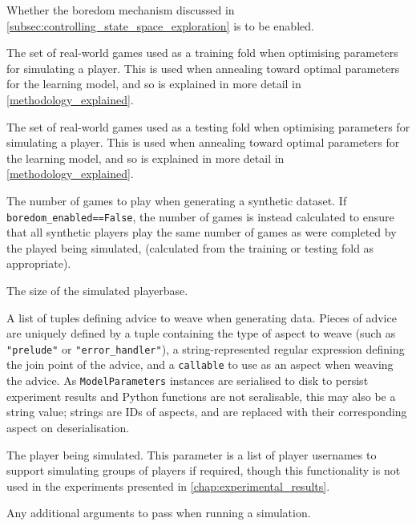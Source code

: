 \begin{description}[style=multiline,leftmargin=3cm]
  \item[boredom\\enabled] Whether the boredom mechanism discussed in
  \cref{subsec:controlling_state_space_exploration} is to be enabled.
  \item[training\\data] The set of real-world games used as a training fold when
  optimising parameters for simulating a player. This is used when annealing
  toward optimal parameters for the learning model, and so is explained in more
  detail in \cref{methodology_explained}.
  \item[testing\\data] The set of real-world games used as a testing fold when
  optimising parameters for simulating a player. This is used when annealing
  toward optimal parameters for the learning model, and so is explained in more
  detail in \cref{methodology_explained}.
  \item[iteration\\base] The number of games to play when generating a synthetic
  dataset. If \lstinline{boredom_enabled==False}, the number of games is instead
  calculated to ensure that all synthetic players play the same number of games
  as were completed by the played being simulated, (calculated from the training
  or testing fold as appropriate).
  \item[number\\simulated\\players] The size of the simulated playerbase.
  \item[advice] A list of tuples defining advice to weave when generating data.
  Pieces of advice are uniquely defined by a tuple containing the type of aspect
  to weave (such as \lstinline{"prelude"} or \lstinline{"error_handler"}), a
  string-represented regular expression defining the join point of the advice,
  and a \lstinline{callable} to use as an aspect when weaving the advice. As
  \lstinline{ModelParameters} instances are serialised to disk to persist
  experiment results and Python functions are not seralisable, this may also be
  a string value; strings are IDs of aspects, and are replaced with their
  corresponding aspect on deserialisation.
  \item[players] The player being simulated. This parameter is a list of player
  usernames to support simulating groups of players if required, though this
  functionality is not used in the experiments presented in
  \cref{chap:experimental_results}.
  \item[args] Any additional arguments to pass when running a simulation.

\end{description}
